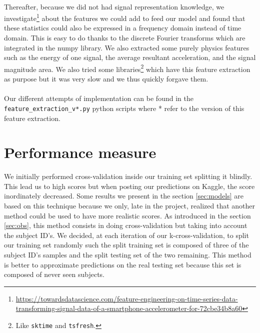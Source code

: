 \documentclass[a4paper, 11pt, oneside]{article}
\begin{document}
\paragraph{}Thereafter, because we did not had signal representation knowledge, we investigate\footnote{\url{https://towardsdatascience.com/feature-engineering-on-time-series-data-transforming-signal-data-of-a-smartphone-accelerometer-for-72cbe34b8a60}} about the features we could add to feed our model and found that these statistics could also be expressed in a frequency domain instead of time domain. This is easy to do thanks to the discrete Fourier transforms which are integrated in the numpy library.
We also extracted some purely physics features such as the energy of one signal, the average resultant acceleration, and the signal magnitude area. We also tried some libraries\footnote{Like \texttt{sktime} and \texttt{tsfresh}.} which have this feature extraction as purpose but it was very slow and we thus quickly forgave them.

\paragraph{}Our different attempts of implementation can be found in the \texttt{feature\_extraction\_v*.py} python scripts where * refer to the version of this feature extraction.


\section{Performance measure}
We initially performed cross-validation inside our training set splitting it blindly. This lead us to high scores but when posting our predictions on Kaggle, the score inordinately decreased. Some results we present in the section \ref{sec:models} are based on this technique because we only, late in the project, realized that another method could be used to have more realistic scores.
As introduced in the section \ref{sec:obs}, this method consists in doing cross-validation but taking into account the subject ID's. We decided, at each iteration of our k-cross-validation, to split our training set randomly such the split training set is composed of three of the subject ID's samples and the split testing set of the two remaining. This method is better to approximate predictions on the real testing set because this set is composed of never seen subjects.
\end{document}
